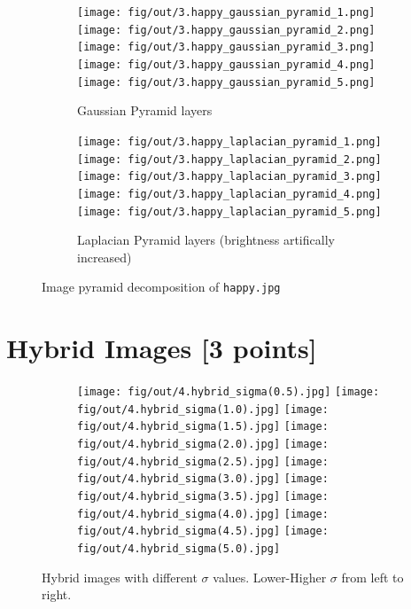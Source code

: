 \documentclass[tikz,14pt,fleqn]{article}
\begin{document}
\begin{figure}[h!]
    \centering
    \begin{subfigure}[]{.7\linewidth}
        \texttt{[image: fig/out/3.happy\_gaussian\_pyramid\_1.png]}
        \texttt{[image: fig/out/3.happy\_gaussian\_pyramid\_2.png]}
        \texttt{[image: fig/out/3.happy\_gaussian\_pyramid\_3.png]}
        \texttt{[image: fig/out/3.happy\_gaussian\_pyramid\_4.png]}
        \texttt{[image: fig/out/3.happy\_gaussian\_pyramid\_5.png]}
        \caption{Gaussian Pyramid layers}
    \end{subfigure}
    \begin{subfigure}[]{.7\linewidth}
        \texttt{[image: fig/out/3.happy\_laplacian\_pyramid\_1.png]}
        \texttt{[image: fig/out/3.happy\_laplacian\_pyramid\_2.png]}
        \texttt{[image: fig/out/3.happy\_laplacian\_pyramid\_3.png]}
        \texttt{[image: fig/out/3.happy\_laplacian\_pyramid\_4.png]}
        \texttt{[image: fig/out/3.happy\_laplacian\_pyramid\_5.png]}     
        \caption{Laplacian Pyramid layers (brightness artifically increased)}
    \end{subfigure}
    \caption{Image pyramid decomposition of \texttt{happy.jpg}}
\end{figure}




\section{Hybrid Images [3 points]}

\begin{figure}[h!]
    \centering
    \begin{subfigure}[]{\linewidth}
        \texttt{[image: fig/out/4.hybrid\_sigma(0.5).jpg]}
        \texttt{[image: fig/out/4.hybrid\_sigma(1.0).jpg]}
        \texttt{[image: fig/out/4.hybrid\_sigma(1.5).jpg]}
        \texttt{[image: fig/out/4.hybrid\_sigma(2.0).jpg]}
        \texttt{[image: fig/out/4.hybrid\_sigma(2.5).jpg]}
        \texttt{[image: fig/out/4.hybrid\_sigma(3.0).jpg]}
        \texttt{[image: fig/out/4.hybrid\_sigma(3.5).jpg]}
        \texttt{[image: fig/out/4.hybrid\_sigma(4.0).jpg]}
        \texttt{[image: fig/out/4.hybrid\_sigma(4.5).jpg]}
        \texttt{[image: fig/out/4.hybrid\_sigma(5.0).jpg]}
    \end{subfigure}
    \caption{Hybrid images with different $\sigma$ values. Lower-Higher $\sigma$ from left to right.}
    \label{fig:4.hybrids}
\end{figure}
\end{document}
